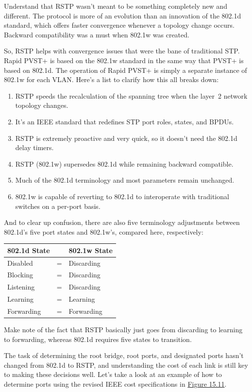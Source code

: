 Understand that RSTP wasn't meant to be something completely new and
different. The protocol is more of an evolution than an innovation of
the 802.1d standard, which offers faster convergence whenever a topology
change occurs. Backward compatibility was a must when 802.1w was
created.

So, RSTP helps with convergence issues that were the bane of traditional
STP. Rapid PVST+ is based on the 802.1w standard in the same way that
PVST+ is based on 802.1d. The operation of Rapid PVST+ is simply a
separate instance of 802.1w for each VLAN. Here's a list to clarify how
this all breaks down:

\begin{enumerate}
\item
  RSTP speeds the recalculation of the spanning tree when the layer~2
  network topology changes.
\item
  It's an IEEE standard that redefines STP port roles, states, and
  BPDUs.
\item
  RSTP is extremely proactive and very quick, so it doesn't need the
  802.1d delay timers.
\item
  RSTP (802.1w) supersedes 802.1d while remaining backward compatible.
\item
  Much of the 802.1d terminology and most parameters remain unchanged.
\item
  802.1w is capable of reverting to 802.1d to interoperate with
  traditional switches on a per-port basis.
\end{enumerate}

And to clear up
confusion, there are also five terminology adjustments between 802.1d's
five port states and 802.1w's, compared here, respectively:

\begin{longtable}[]{@{}lll@{}}
\toprule
802.1d State & & 802.1w State\tabularnewline
\midrule
\endhead
Disabled & = & Discarding\tabularnewline
Blocking & = & Discarding\tabularnewline
Listening & = & Discarding\tabularnewline
Learning & = & Learning\tabularnewline
Forwarding & = & Forwarding\tabularnewline
\bottomrule
\end{longtable}

Make note of the fact that RSTP basically just goes from discarding to
learning to forwarding, whereas 802.1d requires five states to
transition.

The task of determining the root bridge, root ports, and designated
ports hasn't changed from 802.1d to RSTP, and understanding the cost of
each link is still key to making these decisions well. Let's take a look
at an example of how to determine ports using the revised IEEE cost
specifications in
\protect\hyperlink{c15.xhtmlux5cux23figure15-11}{Figure 15.11}.


